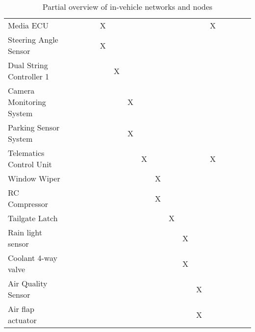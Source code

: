 \begin{table}[htb]
{\begin{tabular}{@{}llllllllllllllllll@{}}
    Media ECU                &   &   &   &   & X &   &   &   &   &   &   &   & X &   &   &   &   \\
    Steering Angle Sensor    &   &   &   &   & X &   &   &   &   &   &   &   &   &   &   &   &   \\
    Dual String Controller 1 &   &   &   &   &   & X &   &   &   &   &   &   &   &   &   &   &   \\
    Camera Monitoring System &   &   &   &   &   &   & X &   &   &   &   &   &   &   &   &   &   \\
    Parking Sensor System    &   &   &   &   &   &   & X &   &   &   &   &   &   &   &   &   &   \\
    Telematics Control Unit  &   &   &   &   &   &   &   & X &   &   &   &   & X &   &   &   &   \\
    Window Wiper             &   &   &   &   &   &   &   &   & X &   &   &   &   &   &   &   &   \\
    RC Compressor            &   &   &   &   &   &   &   &   & X &   &   &   &   &   &   &   &   \\
    Tailgate Latch           &   &   &   &   &   &   &   &   &   & X &   &   &   &   &   &   &   \\
    Rain light sensor        &   &   &   &   &   &   &   &   &   &   & X &   &   &   &   &   &   \\
    Coolant 4-way valve      &   &   &   &   &   &   &   &   &   &   & X &   &   &   &   &   &   \\
    Air Quality Sensor       &   &   &   &   &   &   &   &   &   &   &   & X &   &   &   &   &   \\
    Air flap actuator        &   &   &   &   &   &   &   &   &   &   &   & X &   &   &   &   &   \\
\end{tabular}%
}
\caption{Partial overview of in-vehicle networks and nodes}
\label{tab:networks}
\end{table}
